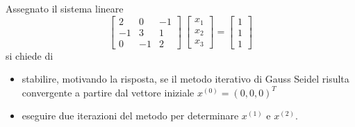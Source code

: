  Assegnato il sistema lineare
\[ \left[ \begin{array} {ccc} 2 & 0 & -1\\ -1 & 3 & 1\\ 0 & -1&2
\end{array} \right] \ \left[ \begin{array}{c}  x_1 \\ x_2 \\
x_3 
\end{array} \right] =
\left[ \begin{array}{ccc}  1 \\ 1 \\1 
\end{array} \right] \]
si chiede di
\begin{itemize}
\item 
stabilire, motivando la risposta, se il metodo iterativo di
Gauss Seidel risulta convergente a partire dal vettore iniziale
$x^{(0)}=(0,0,0)^T$
\item eseguire due iterazioni del metodo per determinare $x^{(1)}$ e
$x^{(2)}$.
\end{itemize}
